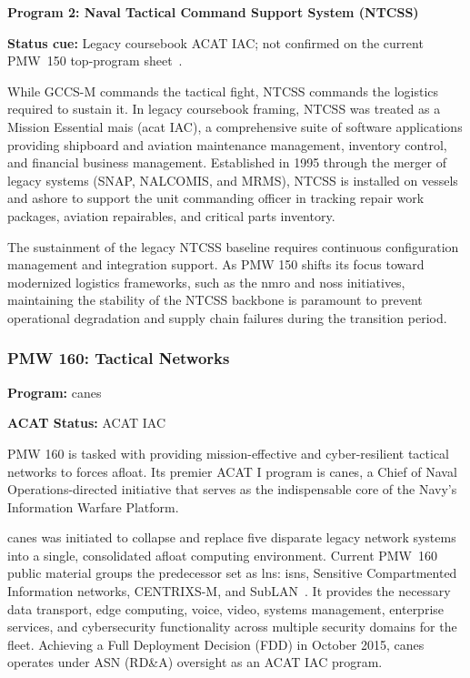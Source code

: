 \documentclass[../main.tex]{subfiles}
\begin{document}
\textbf{Program 2: Naval Tactical Command Support System (NTCSS)}

\textbf{Status cue:} Legacy coursebook ACAT IAC; not confirmed on the current PMW~150 top-program sheet~\autocite{PEOC4I-PMW150-tearsheet-2026}.

While GCCS-M commands the tactical fight, NTCSS commands the logistics required to sustain it. In legacy coursebook framing, NTCSS was treated as a Mission Essential \ac{mais} (\ac{acat} IAC), a comprehensive suite of software applications providing shipboard and aviation maintenance management, inventory control, and financial business management. Established in 1995 through the merger of legacy systems (SNAP, NALCOMIS, and MRMS), NTCSS is installed on vessels and ashore to support the unit commanding officer in tracking repair work packages, aviation repairables, and critical parts inventory.

The sustainment of the legacy NTCSS baseline requires continuous configuration management and integration support. As PMW 150 shifts its focus toward modernized logistics frameworks, such as the \ac{nmro} and \ac{noss} initiatives, maintaining the stability of the NTCSS backbone is paramount to prevent operational degradation and supply chain failures during the transition period.

\subsubsection{PMW 160: Tactical Networks}
\label{ssubsec:pmw160}

\textbf{Program:} \ac{canes}

\textbf{ACAT Status:} ACAT IAC~\autocite{PEOC4I-PMW160-tearsheet-2025}

PMW 160 is tasked with providing mission-effective and cyber-resilient tactical networks to forces afloat. Its premier ACAT I program is \ac{canes}, a Chief of Naval Operations-directed initiative that serves as the indispensable core of the Navy's Information Warfare Platform.

\ac{canes} was initiated to collapse and replace five disparate legacy network systems into a single, consolidated afloat computing environment. Current PMW~160 public material groups the predecessor set as \ac{lns}: \ac{isns}, Sensitive Compartmented Information networks, CENTRIXS-M, and SubLAN~\autocite{PEOC4I-PMW160-tearsheet-2025}. It provides the necessary data transport, edge computing, voice, video, systems management, enterprise services, and cybersecurity functionality across multiple security domains for the fleet. Achieving a Full Deployment Decision (FDD) in October 2015, \ac{canes} operates under ASN (RD\&A) oversight as an ACAT IAC program.
\end{document}
